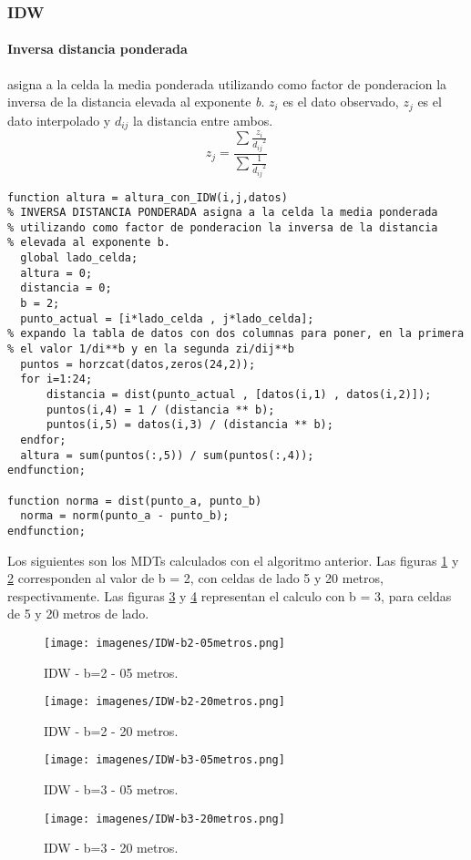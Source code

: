 \documentclass{article}
\begin{document}
\subsubsection{IDW}
\paragraph{Inversa distancia ponderada} asigna a la celda la media ponderada
utilizando como factor de ponderacion la inversa de la distancia
elevada al exponente \textit{b}. $z_i$ es el dato observado, $z_j$ es el dato
interpolado y $d_{ij}$ la distancia entre ambos.
\begin{equation*}
z_j = \frac{\sum \frac{z_i}{{d_{ij}}^2}}{\sum \frac{1}{{d_{ij}}^2}}
\end{equation*}
\begin{verbatim}
function altura = altura_con_IDW(i,j,datos)
% INVERSA DISTANCIA PONDERADA asigna a la celda la media ponderada
% utilizando como factor de ponderacion la inversa de la distancia
% elevada al exponente b.
  global lado_celda;
  altura = 0;
  distancia = 0;
  b = 2;
  punto_actual = [i*lado_celda , j*lado_celda];
% expando la tabla de datos con dos columnas para poner, en la primera
% el valor 1/di**b y en la segunda zi/dij**b
  puntos = horzcat(datos,zeros(24,2));
  for i=1:24;
      distancia = dist(punto_actual , [datos(i,1) , datos(i,2)]);
      puntos(i,4) = 1 / (distancia ** b);
      puntos(i,5) = datos(i,3) / (distancia ** b);
  endfor;
  altura = sum(puntos(:,5)) / sum(puntos(:,4));
endfunction;

function norma = dist(punto_a, punto_b)
  norma = norm(punto_a - punto_b);
endfunction;
\end{verbatim}

Los siguientes son los MDTs calculados con el algoritmo anterior. Las
figuras \ref{fig:mdt-idwb205} y \ref{fig:mdt-idwb220} corresponden al
valor de b = 2, con celdas de lado 5 y 20 metros, respectivamente.
Las figuras \ref{fig:mdt-idwb305} y \ref{fig:mdt-idwb320} representan
el calculo con b = 3, para celdas de 5 y 20 metros de lado.

\begin{figure}[H]
  \centering
  \texttt{[image: imagenes/IDW-b2-05metros.png]}
  \caption{IDW - b=2 - 05 metros.}
  \label{fig:mdt-idwb205}
\end{figure}
\begin{figure}[H]
  \centering
  \texttt{[image: imagenes/IDW-b2-20metros.png]}
  \caption{IDW - b=2 - 20 metros.}
  \label{fig:mdt-idwb220}
\end{figure}
\begin{figure}[H]
  \centering
  \texttt{[image: imagenes/IDW-b3-05metros.png]}
  \caption{IDW - b=3 - 05 metros.}
  \label{fig:mdt-idwb305}
\end{figure}
\begin{figure}[H]
  \centering
  \texttt{[image: imagenes/IDW-b3-20metros.png]}
  \caption{IDW - b=3 - 20 metros.}
  \label{fig:mdt-idwb320}
\end{figure}
\end{document}
